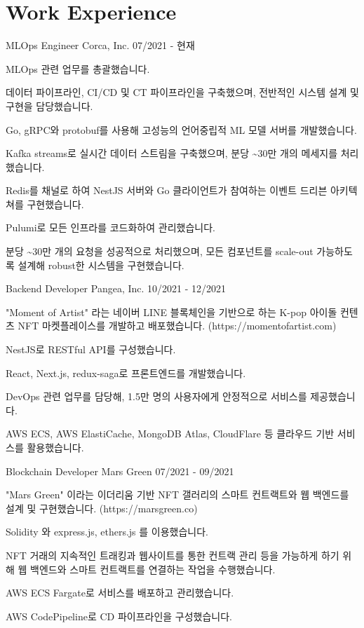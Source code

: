 \section{Work Experience}

\cventry
{MLOps Engineer} %
{Corca, Inc.} %
{} %
{07/2021 - 현재} %
\begin{cvitems}
\item {MLOps 관련 업무를 총괄했습니다.}
\item {데이터 파이프라인, CI/CD 및 CT 파이프라인을 구축했으며, 전반적인 시스템 설계 및 구현을 담당했습니다.}
\item {Go, gRPC와 protobuf를 사용해 고성능의 언어중립적 ML 모델 서버를 개발했습니다.}
\item {Kafka streams로 실시간 데이터 스트림을 구축했으며, 분당 \textasciitilde 30만 개의 메세지를 처리했습니다.}
\item {Redis를 채널로 하여 NestJS 서버와 Go 클라이언트가 참여하는 이벤트 드리븐 아키텍쳐를 구현했습니다.}
\item {Pulumi로 모든 인프라를 코드화하여 관리했습니다.}
\item {분당 \textasciitilde 30만 개의 요청을 성공적으로 처리했으며, 모든 컴포넌트를 scale-out 가능하도록 설계해 robust한 시스템을 구현했습니다.}
\end{cvitems}

\cventry
{Backend Developer} %
{Pangea, Inc.} %
{} %
{10/2021 - 12/2021} %
\begin{cvitems}
\item {"Moment of Artist" 라는 네이버 LINE 블록체인을 기반으로 하는 K-pop 아이돌 컨텐츠 NFT 마켓플레이스를 개발하고 배포했습니다. (https://momentofartist.com)}
\item {NestJS로 RESTful API를 구성했습니다.}
\item {React, Next.js, redux-saga로 프론트엔드를 개발했습니다.}
\item {DevOps 관련 업무를 담당해, 1.5만 명의 사용자에게 안정적으로 서비스를 제공했습니다.}
\item {AWS ECS, AWS ElastiCache, MongoDB Atlas, CloudFlare 등 클라우드 기반 서비스를 활용했습니다.}
\end{cvitems}

\cventry
{Blockchain Developer} %
{Mars Green} %
{} %
{07/2021 - 09/2021} %
\begin{cvitems}
\item {"Mars Green" 이라는 이더리움 기반 NFT 갤러리의 스마트 컨트랙트와 웹 백엔드를 설계 및 구현했습니다. (https://marsgreen.co)}
\item {Solidity 와 express.js, ethers.js 를 이용했습니다.}
\item {NFT 거래의 지속적인 트래킹과 웹사이트를 통한 컨트랙 관리 등을 가능하게 하기 위해 웹 백엔드와 스마트 컨트랙트를 연결하는 작업을 수행했습니다.}
\item {AWS ECS Fargate로 서비스를 배포하고 관리했습니다.}
\item {AWS CodePipeline로 CD 파이프라인을 구성했습니다.}
\end{cvitems}


